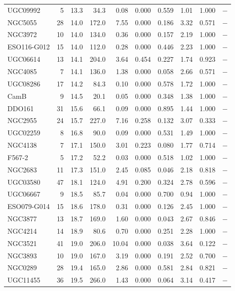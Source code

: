 \begin{longtable}{lrrrrrrrrr}
UGC09992 & 5 & 13.3 & 34.3 & 0.08 & 0.000 & 0.559 & 1.01 & 1.000 & $-$ \\
NGC5055 & 28 & 14.0 & 172.0 & 7.55 & 0.000 & 0.186 & 3.32 & 0.571 & $-$ \\
NGC3972 & 10 & 14.0 & 134.0 & 0.36 & 0.000 & 0.157 & 2.19 & 1.000 & $-$ \\
ESO116-G012 & 15 & 14.0 & 112.0 & 0.28 & 0.000 & 0.446 & 2.23 & 1.000 & $-$ \\
UGC06614 & 13 & 14.1 & 204.0 & 3.64 & 0.454 & 0.227 & 1.74 & 0.923 & $-$ \\
NGC4085 & 7 & 14.1 & 136.0 & 1.38 & 0.000 & 0.058 & 2.66 & 0.571 & $-$ \\
UGC08286 & 17 & 14.2 & 84.3 & 0.10 & 0.000 & 0.578 & 1.72 & 1.000 & $-$ \\
CamB & 9 & 14.5 & 20.1 & 0.05 & 0.000 & 0.348 & 1.38 & 1.000 & $-$ \\
DDO161 & 31 & 15.6 & 66.1 & 0.09 & 0.000 & 0.895 & 1.44 & 1.000 & $-$ \\
NGC2955 & 24 & 15.7 & 227.0 & 7.16 & 0.258 & 0.132 & 3.07 & 0.333 & $-$ \\
UGC02259 & 8 & 16.8 & 90.0 & 0.09 & 0.000 & 0.531 & 1.49 & 1.000 & $-$ \\
NGC4138 & 7 & 17.1 & 150.0 & 3.01 & 0.223 & 0.080 & 1.77 & 0.714 & $-$ \\
F567-2 & 5 & 17.2 & 52.2 & 0.03 & 0.000 & 0.518 & 1.02 & 1.000 & $-$ \\
NGC2683 & 11 & 17.3 & 151.0 & 2.45 & 0.085 & 0.046 & 2.18 & 0.818 & $-$ \\
UGC03580 & 47 & 18.1 & 124.0 & 4.91 & 0.200 & 0.324 & 2.78 & 0.596 & $-$ \\
UGC06667 & 9 & 18.5 & 85.7 & 0.04 & 0.000 & 0.700 & 0.94 & 1.000 & $-$ \\
ESO079-G014 & 15 & 18.6 & 178.0 & 0.31 & 0.000 & 0.126 & 2.45 & 1.000 & $-$ \\
NGC3877 & 13 & 18.7 & 169.0 & 1.60 & 0.000 & 0.043 & 2.67 & 0.846 & $-$ \\
NGC4214 & 14 & 18.9 & 80.6 & 0.70 & 0.000 & 0.251 & 2.28 & 1.000 & $-$ \\
NGC3521 & 41 & 19.0 & 206.0 & 10.04 & 0.000 & 0.038 & 3.64 & 0.122 & $-$ \\
NGC3893 & 10 & 19.0 & 167.0 & 3.19 & 0.000 & 0.191 & 2.52 & 0.700 & $-$ \\
NGC0289 & 28 & 19.4 & 165.0 & 2.86 & 0.000 & 0.581 & 2.84 & 0.821 & $-$ \\
UGC11455 & 36 & 19.5 & 266.0 & 1.43 & 0.000 & 0.064 & 3.14 & 0.417 & $-$ \\

\end{longtable}
